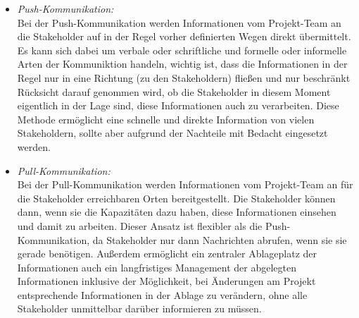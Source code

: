 \documentclass[ThesisDJ.tex]{subfiles}
\begin{document}
\begin{itemize}
	\item \emph{Push-Kommunikation:}\\
	Bei der Push-Kommunikation werden Informationen vom Projekt-Team an die Stakeholder auf in der Regel vorher definierten Wegen direkt übermittelt. Es kann sich dabei um verbale oder schriftliche und formelle oder informelle Arten der Kommuniktion handeln, wichtig ist, dass die Informationen in der Regel nur in eine Richtung (zu den Stakeholdern) fließen und nur beschränkt Rücksicht darauf genommen wird, ob die Stakeholder in diesem Moment eigentlich in der Lage sind, diese Informationen auch zu verarbeiten. Diese Methode ermöglicht eine schnelle und direkte Information von vielen Stakeholdern, sollte aber aufgrund der Nachteile mit Bedacht eingesetzt werden.
	\item \emph{Pull-Kommunikation:}\\
	Bei der Pull-Kommunikation werden Informationen vom Projekt-Team an für die Stakeholder erreichbaren Orten bereitgestellt. Die Stakeholder können dann, wenn sie die Kapazitäten dazu haben, diese Informationen einsehen und damit zu arbeiten. Dieser Ansatz ist flexibler als die Push-Kommunikation, da Stakeholder nur dann Nachrichten abrufen, wenn sie sie gerade benötigen. Außerdem ermöglicht ein zentraler Ablageplatz der Informationen auch ein langfristiges Management der abgelegten Informationen inklusive der Möglichkeit, bei Änderungen am Projekt entsprechende Informationen in der Ablage zu verändern, ohne alle Stakeholder unmittelbar darüber informieren zu müssen.
\end{itemize}
\end{document}
